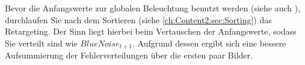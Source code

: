 Bevor die Anfangswerte zur globalen Beleuchtung benutzt werden (siehe auch ), durchlaufen Sie nach dem Sortieren 
(siehe \ref{ch:Content2:sec:Sorting}) das Retargeting. Der Sinn liegt hierbei beim Vertauschen der Anfangswerte, sodass Sie 
verteilt sind wie $BlueNoise_{t+1}$. Aufgrund dessen ergibt sich eine bessere Aufsummierung der
 Fehlerverteilungen über die ersten paar Bilder.
\par 

\begin{figure}[H]
    \begin{tcolorbox}[boxrule=4pt,sharp corners=downhill,title=Bedeutung des Retargeting]

\end{tcolorbox}
\end{figure}
